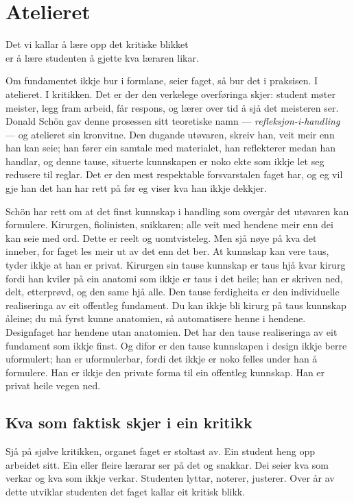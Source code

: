 \chapter{Atelieret}

\begin{motto}
Det vi kallar å lære opp det kritiske blikket\\ er å lære studenten å gjette kva læraren likar.
\end{motto}

Om fundamentet ikkje bur i formlane, seier faget, så bur det i praksisen. I atelieret. I kritikken. Det er der den verkelege overføringa skjer: student møter meister, legg fram arbeid, får respons, og lærer over tid å sjå det meisteren ser. Donald Schön gav denne prosessen sitt teoretiske namn — \emph{refleksjon-i-handling} — og atelieret sin kronvitne. Den dugande utøvaren, skreiv han, veit meir enn han kan seie; han fører ein samtale med materialet, han reflekterer medan han handlar, og denne tause, situerte kunnskapen er noko ekte som ikkje let seg redusere til reglar. Det er den mest respektable forsvarstalen faget har, og eg vil gje han det han har rett på før eg viser kva han ikkje dekkjer.

Schön har rett om at det finst kunnskap i handling som overgår det utøvaren kan formulere. Kirurgen, fiolinisten, snikkaren; alle veit med hendene meir enn dei kan seie med ord. Dette er reelt og uomtvisteleg. Men sjå nøye på kva det inneber, for faget les meir ut av det enn det ber. At kunnskap kan vere taus, tyder ikkje at han er privat. Kirurgen sin tause kunnskap er taus hjå kvar kirurg fordi han kviler på ein anatomi som ikkje er taus i det heile; han er skriven ned, delt, etterprøvd, og den same hjå alle. Den tause ferdigheita er den individuelle realiseringa av eit offentleg fundament. Du kan ikkje bli kirurg på taus kunnskap åleine; du må fyrst kunne anatomien, så automatisere henne i hendene. Designfaget har hendene utan anatomien. Det har den tause realiseringa av eit fundament som ikkje finst. Og difor er den tause kunnskapen i design ikkje berre uformulert; han er uformulerbar, fordi det ikkje er noko felles under han å formulere. Han er ikkje den private forma til ein offentleg kunnskap. Han er privat heile vegen ned.

\section{Kva som faktisk skjer i ein kritikk}

Sjå på sjølve kritikken, organet faget er stoltast av. Ein student heng opp arbeidet sitt. Ein eller fleire lærarar ser på det og snakkar. Dei seier kva som verkar og kva som ikkje verkar. Studenten lyttar, noterer, justerer. Over år av dette utviklar studenten det faget kallar eit kritisk blikk.

